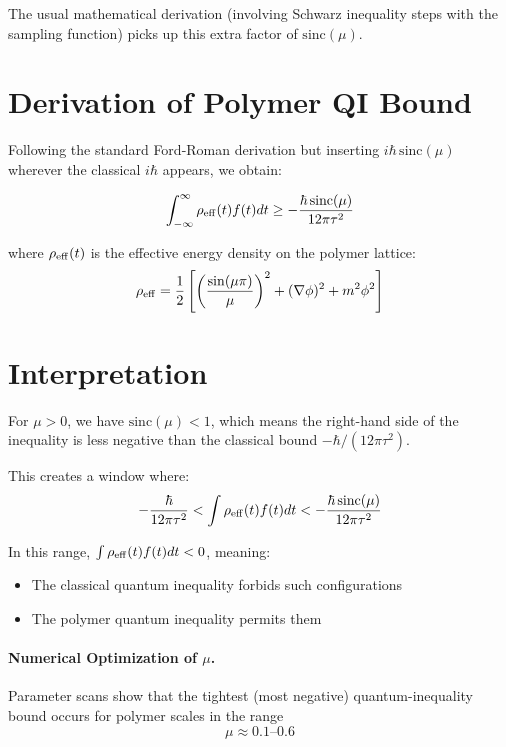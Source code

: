 \documentclass[11pt]{article}
\begin{document}
The usual mathematical derivation (involving Schwarz inequality steps with the sampling function) picks up this extra factor of $\mathrm{sinc}(\mu)$.

\section{Derivation of Polymer QI Bound}

Following the standard Ford-Roman derivation but inserting $i\hbar\,\mathrm{sinc}(\mu)$ wherever the classical $i\hbar$ appears, we obtain:

\begin{equation}
\int_{-\infty}^{\infty} \rho_{\rm eff}(t) f(t) dt \geq -\frac{\hbar\,\mathrm{sinc}(\mu)}{12\pi\tau^2}
\end{equation}

where $\rho_{\rm eff}(t)$ is the effective energy density on the polymer lattice:
\begin{equation}
\rho_{\rm eff} = \frac{1}{2}\left[\left(\frac{\sin(\mu\pi)}{\mu}\right)^2 + (\nabla\phi)^2 + m^2\phi^2\right]
\end{equation}

\section{Interpretation}

For $\mu > 0$, we have $\mathrm{sinc}(\mu) < 1$, which means the right-hand side of the inequality is less negative than the classical bound $-\hbar/(12\pi\tau^2)$.

This creates a window where:
\begin{equation}
-\frac{\hbar}{12\pi\tau^2} < \int \rho_{\rm eff}(t) f(t) dt < -\frac{\hbar\,\mathrm{sinc}(\mu)}{12\pi\tau^2}
\end{equation}

In this range, $\int \rho_{\rm eff}(t) f(t) dt < 0$, meaning:
\begin{itemize}
\item The classical quantum inequality forbids such configurations
\item The polymer quantum inequality permits them
\end{itemize}

\paragraph{Numerical Optimization of $\mu$.}
Parameter scans show that the tightest (most negative) quantum-inequality bound occurs for polymer scales in the range
\begin{equation}
\mu \approx 0.1 \text{--} 0.6
\end{equation}
\end{document}
